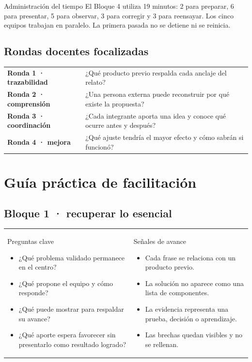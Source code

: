 \documentclass[10pt,a4paper]{article}
\begin{document}
\vspace{6mm}
\begin{accentbox}{Administración del tiempo}
El Bloque 4 utiliza 19 minutos: 2 para preparar, 6 para presentar, 5 para observar, 3 para corregir y 3 para reensayar. Los cinco equipos trabajan en paralelo. La primera pasada no se detiene ni se reinicia.
\end{accentbox}

\subsection{Rondas docentes focalizadas}
\begin{tabularx}{\textwidth}{@{}p{36mm}Y@{}}
\textbf{Ronda 1 · trazabilidad} & ¿Qué producto previo respalda cada anclaje del relato? \\
\textbf{Ronda 2 · comprensión} & ¿Una persona externa puede reconstruir por qué existe la propuesta? \\
\textbf{Ronda 3 · coordinación} & ¿Cada integrante aporta una idea y conoce qué ocurre antes y después? \\
\textbf{Ronda 4 · mejora} & ¿Qué ajuste tendría el mayor efecto y cómo sabrán si funcionó? \\
\end{tabularx}

\newpage
\section{Guía práctica de facilitación}

\subsection{Bloque 1 · recuperar lo esencial}
\begin{tabularx}{\textwidth}{@{}Y@{\hspace{5mm}}Y@{}}
\begin{docbox}[height=58mm]{Preguntas clave}
\begin{itemize}
  \item ¿Qué problema validado permanece en el centro?
  \item ¿Qué propone el equipo y cómo responde?
  \item ¿Qué puede mostrar para respaldar su avance?
  \item ¿Qué aporte espera favorecer sin presentarlo como resultado logrado?
\end{itemize}
\end{docbox}
&
\begin{docbox}[height=58mm]{Señales de avance}
\begin{itemize}
  \item Cada frase se relaciona con un producto previo.
  \item La solución no aparece como una lista de componentes.
  \item La evidencia representa una prueba, decisión o aprendizaje.
  \item Las brechas quedan visibles y no se rellenan.
\end{itemize}
\end{docbox}
\end{tabularx}
\end{document}

